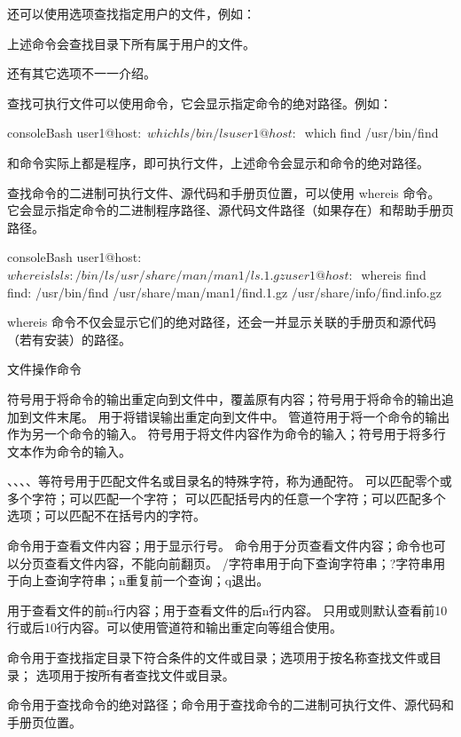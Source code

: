 还可以使用选项查找指定用户的文件，例如：
上述命令会查找目录下所有属于用户的文件。

还有其它选项不一一介绍。

查找可执行文件可以使用命令，它会显示指定命令的绝对路径。例如：
\begin{envcode}{console}{Bash}
user1@host:~$ which ls
/bin/ls
user1@host:~$ which find
/usr/bin/find
\end{envcode}
和命令实际上都是程序，即可执行文件，上述命令会显示和命令的绝对路径。

查找命令的二进制可执行文件、源代码和手册页位置，可以使用 whereis 命令。
它会显示指定命令的二进制程序路径、源代码文件路径（如果存在）和帮助手册页路径。
\begin{envcode}{console}{Bash}
user1@host:~$ whereis ls
ls: /bin/ls /usr/share/man/man1/ls.1.gz
user1@host:~$ whereis find
find: /usr/bin/find /usr/share/man/man1/find.1.gz /usr/share/info/find.info.gz
\end{envcode}
whereis 命令不仅会显示它们的绝对路径，还会一并显示关联的手册页和源代码（若有安装）的路径。

\begin{zj}
文件操作命令

\code{>}符号用于将命令的输出重定向到文件中，覆盖原有内容；\code{>>}符号用于将命令的输出追加到文件末尾。
用于将错误输出重定向到文件中。
\code{|}管道符用于将一个命令的输出作为另一个命令的输入。
\code{<}符号用于将文件内容作为命令的输入；\code{<<}符号用于将多行文本作为命令的输入。

\code{*}、、\code{[ ]}、\code{{ }}、\code{[! ]}等符号用于匹配文件名或目录名的特殊字符，称为通配符。
\code{*}可以匹配零个或多个字符；可以匹配一个字符；
\code{[ ]}可以匹配括号内的任意一个字符；\code{{ }}可以匹配多个选项；\code{[! ]}可以匹配不在括号内的字符。

命令用于查看文件内容；用于显示行号。
命令用于分页查看文件内容；命令也可以分页查看文件内容，不能向前翻页。
/字符串用于向下查询字符串；?字符串用于向上查询字符串；n重复前一个查询；q退出。

用于查看文件的前n行内容；用于查看文件的后n行内容。
只用或则默认查看前10行或后10行内容。可以使用管道符\code{|}和输出重定向等组合使用。

命令用于查找指定目录下符合条件的文件或目录；选项用于按名称查找文件或目录；
选项用于按所有者查找文件或目录。

命令用于查找命令的绝对路径；命令用于查找命令的二进制可执行文件、源代码和手册页位置。
\end{zj}


